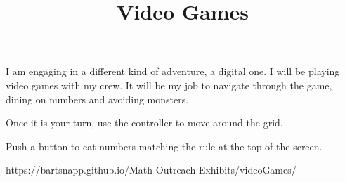 \documentclass{../exhibit}
\title{Video Games}
\begin{document}
\begin{context}
  I am engaging in a different kind of adventure, a digital one. I will be playing video games with my crew.
  It will be my job to navigate through the game, dining on numbers and avoiding monsters.
\end{context}

\begin{directions}
  Once it is your turn, 
  use the controller to move around the grid.

  Push a button to eat numbers matching the rule at the top of the
screen.
\end{directions}

\begin{example}
\end{example}

\begin{mathConnections}
  https://bartsnapp.github.io/Math-Outreach-Exhibits/videoGames/
\end{mathConnections}
\end{document}
